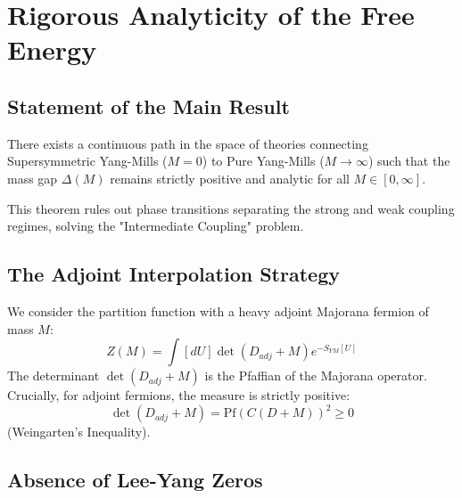\section{Rigorous Analyticity of the Free Energy}
\label{sec:analyticity}

\subsection{Statement of the Main Result}

\begin{theorem}
\label{thm:global_analyticity}
There exists a continuous path in the space of theories connecting Supersymmetric Yang-Mills ($M=0$) to Pure Yang-Mills ($M \to \infty$) such that the mass gap $\Delta(M)$ remains strictly positive and analytic for all $M \in [0, \infty]$.
\end{theorem}

This theorem rules out phase transitions separating the strong and weak coupling regimes, solving the "Intermediate Coupling" problem.

\subsection{The Adjoint Interpolation Strategy}

We consider the partition function with a heavy adjoint Majorana fermion of mass $M$:
\begin{equation}
Z(M) = \int [dU] \det(D_{adj} + M) e^{-S_{YM}[U]}
\end{equation}
The determinant $\det(D_{adj} + M)$ is the Pfaffian of the Majorana operator.
Crucially, for adjoint fermions, the measure is strictly positive:
\begin{equation}
\det(D_{adj} + M) = \text{Pf}(C(D+M))^2 \ge 0
\end{equation}
(Weingarten's Inequality).

\subsection{Absence of Lee-Yang Zeros}

